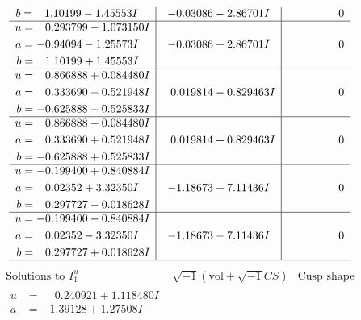 \documentclass[1p]{elsarticle_modified}
\theoremstyle{definition}
\newcommand{\I}{\sqrt{-1}}
\begin{document}
$$\begin{array}{c|c|c}
\begin{aligned}
b &= \phantom{-}1.10199 - 1.45553 I\end{aligned}
 & -0.03086 - 2.86701 I & \phantom{-0.000000 } 0 \\ \hline\begin{aligned}
u &= \phantom{-}0.293799 - 1.073150 I \\
a &= -0.94094 - 1.25573 I \\
b &= \phantom{-}1.10199 + 1.45553 I\end{aligned}
 & -0.03086 + 2.86701 I & \phantom{-0.000000 } 0 \\ \hline\begin{aligned}
u &= \phantom{-}0.866888 + 0.084480 I \\
a &= \phantom{-}0.333690 - 0.521948 I \\
b &= -0.625888 - 0.525833 I\end{aligned}
 & \phantom{-}0.019814 - 0.829463 I & \phantom{-0.000000 } 0 \\ \hline\begin{aligned}
u &= \phantom{-}0.866888 - 0.084480 I \\
a &= \phantom{-}0.333690 + 0.521948 I \\
b &= -0.625888 + 0.525833 I\end{aligned}
 & \phantom{-}0.019814 + 0.829463 I & \phantom{-0.000000 } 0 \\ \hline\begin{aligned}
u &= -0.199400 + 0.840884 I \\
a &= \phantom{-}0.02352 + 3.32350 I \\
b &= \phantom{-}0.297727 - 0.018628 I\end{aligned}
 & -1.18673 + 7.11436 I & \phantom{-0.000000 } 0 \\ \hline\begin{aligned}
u &= -0.199400 - 0.840884 I \\
a &= \phantom{-}0.02352 - 3.32350 I \\
b &= \phantom{-}0.297727 + 0.018628 I\end{aligned}
 & -1.18673 - 7.11436 I & \phantom{-0.000000 } 0\\
 \hline 
 \end{array}$$\newpage$$\begin{array}{c|c|c}  
\text{Solutions to }I^u_{1}& \I (\text{vol} + \sqrt{-1}CS) & \text{Cusp shape}\\
 \hline 
\begin{aligned}
u &= \phantom{-}0.240921 + 1.118480 I \\
a &= -1.39128 + 1.27508 I \\

\end{aligned}
\end{array}$$
\end{document}
